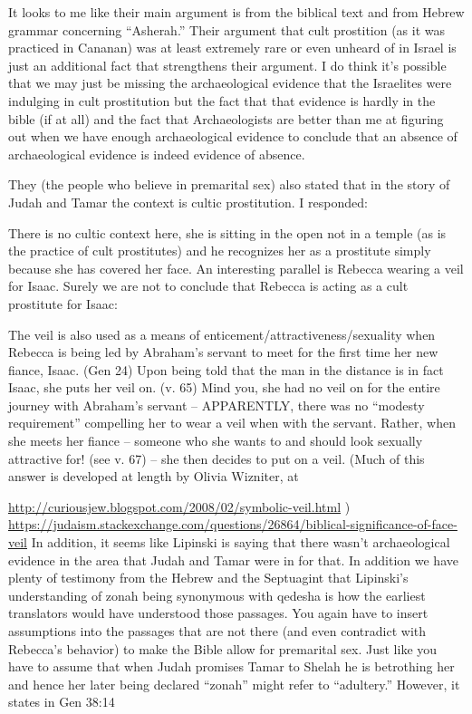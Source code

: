 \documentclass[11pt]{article}
\begin{document}
It looks to me like their main argument is from the biblical text and from Hebrew grammar concerning “Asherah.” Their argument that cult prostition (as it was practiced in Cananan) was at least extremely rare or even unheard of in Israel is just an additional fact that strengthens their argument. I do think it’s possible that we may just be missing the archaeological evidence that the Israelites were indulging in cult prostitution but the fact that that evidence is hardly in the bible (if at all) and the fact that Archaeologists are better than me at figuring out when we have enough archaeological evidence to conclude that an absence of archaeological evidence is indeed evidence of absence.

They (the people who believe in premarital sex) also stated that in the story of Judah and Tamar the context is cultic prostitution. I responded:

There is no cultic context here, she is sitting in the open not in a temple (as is the practice of cult prostitutes) and he recognizes her as a prostitute simply because she has covered her face. An interesting parallel is Rebecca wearing a veil for Isaac. Surely we are not to conclude that Rebecca is acting as a cult prostitute for Isaac:

The veil is also used as a means of enticement/attractiveness/sexuality when Rebecca is being led by Abraham’s servant to meet for the first time her new fiance, Isaac. (Gen 24) Upon being told that the man in the distance is in fact Isaac, she puts her veil on. (v. 65) Mind you, she had no veil on for the entire journey with Abraham’s servant – APPARENTLY, there was no “modesty requirement” compelling her to wear a veil when with the servant. Rather, when she meets her fiance – someone who she wants to and should look sexually attractive for! (see v. 67) – she then decides to put on a veil.
(Much of this answer is developed at length by Olivia Wizniter, at

\url{http://curiousjew.blogspot.com/2008/02/symbolic-veil.html} ) \newline
\url{https://judaism.stackexchange.com/questions/26864/biblical-significance-of-face-veil}
In addition, it seems like Lipinski is saying that there wasn’t archaeological evidence in the area that Judah and Tamar were in for that. In addition we have plenty of testimony from the Hebrew and the Septuagint that Lipinski’s understanding of zonah being synonymous with qedesha is how the earliest translators would have understood those passages. You again have to insert assumptions into the passages that are not there (and even contradict with Rebecca’s behavior) to make the Bible allow for premarital sex. Just like you have to assume that when Judah promises Tamar to Shelah he is betrothing her and hence her later being declared “zonah” might refer to “adultery.” However, it states in Gen 38:14
\end{document}
